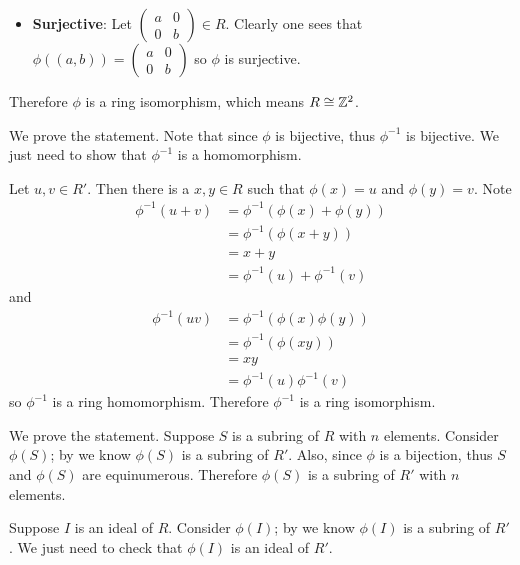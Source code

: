 \begin{questions}
\begin{itemize}
        \item \textbf{Surjective}: Let $\begin{pmatrix}a&0\\0&b\end{pmatrix} \in R$. Clearly one sees that $\phi((a, b)) = \begin{pmatrix}a&0\\0&b\end{pmatrix}$ so $\phi$ is surjective.
    \end{itemize}

    Therefore $\phi$ is a ring isomorphism, which means $R \cong \mathbb{Z}^2$.

    \item \begin{partquestions}{\alph*}
        \item We prove the statement. Note that since $\phi$ is bijective, thus $\phi^{-1}$ is bijective. We just need to show that $\phi^{-1}$ is a homomorphism.
        
        Let $u,v\in R'$. Then there is a $x,y \in R$ such that $\phi(x) = u$ and $\phi(y) = v$. Note
        \begin{align*}
            \phi^{-1}(u + v) &= \phi^{-1}(\phi(x) + \phi(y))\\
            &= \phi^{-1}(\phi(x + y))\\
            &= x + y\\
            &= \phi^{-1}(u) + \phi^{-1}(v)
        \end{align*}
        and
        \begin{align*}
            \phi^{-1}(uv) &= \phi^{-1}(\phi(x)\phi(y))\\
            &= \phi^{-1}(\phi(xy))\\
            &= xy\\
            &= \phi^{-1}(u)\phi^{-1}(v)
        \end{align*}
        so $\phi^{-1}$ is a ring homomorphism. Therefore $\phi^{-1}$ is a ring isomorphism.

        \item We prove the statement. Suppose $S$ is a subring of $R$ with $n$ elements. Consider $\phi(S)$; by  we know $\phi(S)$ is a subring of $R'$. Also, since $\phi$ is a bijection, thus $S$ and $\phi(S)$ are equinumerous. Therefore $\phi(S)$ is a subring of $R'$ with $n$ elements.
        
        \item Suppose $I$ is an ideal of $R$. Consider $\phi(I)$; by  we know $\phi(I)$ is a subring of $R'$. We just need to check that $\phi(I)$ is an ideal of $R'$.
        

\end{partquestions}
\end{questions}

